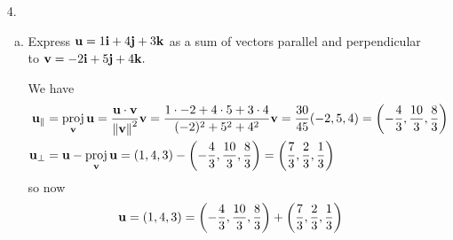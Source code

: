 \documentclass{article}
\newcommand{\vu}{{\bf u}}
\newcommand{\vv}{{\bf v}}
\newcommand{\vi}{{\bf i}}
\newcommand{\vj}{{\bf j}}
\newcommand{\vk}{{\bf k}}
\DeclareMathOperator{\proj}{proj}
\begin{document}
\begin{itemize}
\begin{enumerate}[(a)]
\begin{proof}
					Alternatively, we can use the identities
					\begin{align*}
						\left\lVert \vu\times\vv \right\rVert &= \left\lVert \vu \right\rVert\left\lVert \vv \right\rVert\sin \theta \\
						\vu\cdot\vv &= \left\lVert \vu \right\rVert\left\lVert \vv \right\rVert\cos \theta \\
						\implies \left\lVert \vu\times\vv \right\rVert^2 + (\vu\cdot\vv)^2 &= \left\lVert \vu \right\rVert^2\left\lVert \vv \right\rVert^2\sin^2\theta + \left\lVert \vu \right\rVert^2\left\lVert \vv \right\rVert^2\cos^2\theta \\
						&= \left\lVert \vu \right\rVert^2\left\lVert \vv \right\rVert^2\left( \sin^2\theta+\cos^2\theta \right) = \left\lVert \vu \right\rVert^2\left\lVert \vv \right\rVert^2	 \\
						\implies \left\lVert \vu\times\vv \right\rVert^2 &= \left\lVert \vu \right\rVert^2\left\lVert \vv \right\rVert^2 + (\vu\cdot\vv)^2
					\end{align*}
				\end{proof}

		\end{enumerate}

	\item[4.]
		\begin{enumerate}[(a)]
			\item Express $\vu = 1\vi + 4\vj + 3\vk$ as a sum of vectors parallel and perpendicular to $\vv=-2\vi + 5\vj + 4\vk.$
				\begin{soln}
					We have
					\begin{align*}
						\vu_{\parallel} &= \proj_{\vv}\vu = \frac{\vu\cdot\vv}{\left\lVert \vv \right\rVert^2}\vv = \frac{1\cdot -2 + 4\cdot 5 + 3\cdot 4}{(-2)^2+5^2+4^2}\vv = \frac{30}{45}(-2, 5, 4) = \left( -\frac{4}{3}, \frac{10}{3}, \frac{8}{3} \right) \\
						\vu_{\bot} &= \vu - \proj_{\vv}\vu = (1, 4, 3) - \left( -\frac{4}{3}, \frac{10}{3}, \frac{8}{3} \right) = \left( \frac{7}{3}, \frac{2}{3}, \frac{1}{3} \right)
					\end{align*}
					so now
					\begin{align*}
						\vu = (1, 4, 3) = \left( -\frac{4}{3}, \frac{10}{3}, \frac{8}{3} \right) + \left( \frac{7}{3}, \frac{2}{3}, \frac{1}{3} \right)
					\end{align*}
				\end{soln}


\end{enumerate}
\end{itemize}
\end{document}
